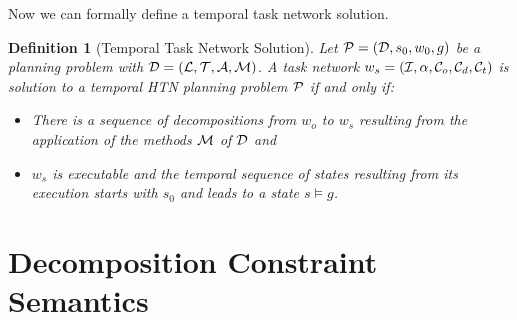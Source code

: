\documentclass[letterpaper]{article} %
\newtheorem{definition}{Definition}
\begin{document}
Now we can formally define a temporal task network solution.

\begin{definition}[Temporal Task Network Solution]
Let ${\cal{P}} = ({\cal{D}}, s_0, w_0, g)$ be a planning problem with $\cal{D} = ({\cal{L}}, {\cal{T}}, {\cal{A}}, {\cal{M}})$. A task network $w_s = ({\cal{I}}, \alpha, {\cal{C}}_o, {\cal{C}}_d, {\cal{C}}_t)$ is solution to a temporal HTN planning problem ${\cal{P}}$ if and only if:
\begin{itemize}
    \item There is a sequence of decompositions from $w_o$ to $w_s$ resulting from the application of the methods ${\cal{M}}$ of ${\cal{D}}$ and
\item $w_s$ is executable and the temporal sequence of states resulting from its execution starts with $s_0$ and leads to a state $s \models g$.
\end{itemize}
\end{definition}

\section{Decomposition Constraint Semantics}
\label{Sec:Decomposition-Constraints-Semantics}
\end{document}
